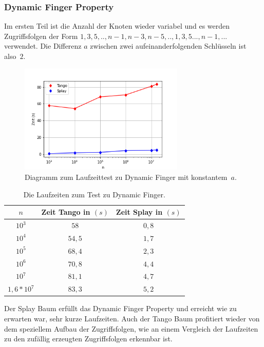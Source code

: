 \documentclass[a4paper,12pt]{article}
\begin{document}
\subsubsection{Dynamic Finger Property}
Im ersten Teil ist die Anzahl der Knoten wieder variabel und es werden Zugriffsfolgen der Form  $1, 3, 5,..,n-1, n-3, n-5, ..,1, 3, 5..., n-1,...$ verwendet. Die Differenz $a$ zwischen zwei aufeinanderfolgenden Schlüsseln ist \mbox{also $2$}.
\begin{figure}[H]
	\centering
	\includegraphics[width=0.7\textwidth]{"Medien/laufzeittest/diagramm/dynamicfinger"}
	\caption{Diagramm zum Laufzeittest zu Dynamic Finger mit \mbox{konstantem $a$.}}
\end{figure}
\begin{table}[H]
	\begin{center}
		\begin{tabular}[c]{|c|c|c|}
			\hline
			$n$ & Zeit Tango in $\left(s\right)$ &Zeit Splay in $\left(s\right)$ \\
			\hline
			$10^3$ & $58$ &$0,8$ \\
			\hline
			$10^4$  & $54,5$ &$1,7$  \\
			\hline
			$10^5$  & $68,4$ &$2,3$  \\
			\hline
			$10^6$  & $70,8$ &$4,4$  \\
			\hline
			$10^7$  & $81,1$ &$4,7$  \\
			\hline
			$1,6 *10^7$  & $83,3$ &$5,2$  \\
			\hline
		\end{tabular}
		\caption{Die Laufzeiten zum  Test zu Dynamic Finger.} 
	\end{center}
\end{table}
\noindent Der Splay Baum erfüllt das Dynamic Finger Property und erreicht wie zu erwarten war, sehr kurze Laufzeiten. Auch der Tango Baum profitiert wieder von dem speziellem Aufbau der Zugriffsfolgen, wie an einem Vergleich der Laufzeiten zu den zufällig erzeugten Zugriffsfolgen erkennbar ist. 
\end{document}
